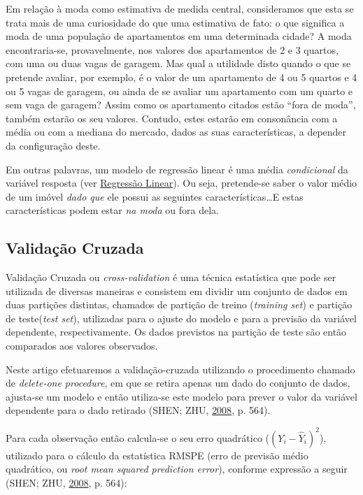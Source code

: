 \documentclass[a4paper, 12pt]{article}
\begin{document}
Em relação à moda como estimativa de medida central, consideramos que
esta se trata mais de uma curiosidade do que uma estimativa de fato: o
que significa a moda de uma população de apartamentos em uma determinada
cidade? A moda encontraria-se, provavelmente, nos valores dos
apartamentos de 2 e 3 quartos, com uma ou duas vagas de garagem. Mas
qual a utilidade disto quando o que se pretende avaliar, por exemplo, é
o valor de um apartamento de 4 ou 5 quartos e 4 ou 5 vagas de garagem,
ou ainda de se avaliar um apartamento com um quarto e sem vaga de
garagem? Assim como os apartamento citados estão ``fora de moda'',
também estarão os seu valores. Contudo, estes estarão em consonância com
a média ou com a mediana do mercado, dados as suas características, a
depender da configuração deste.

Em outras palavras, um modelo de regressão linear é uma média
\emph{condicional} da variável resposta (ver
\protect\hyperlink{regressao-linear}{Regressão Linear}). Ou seja,
pretende-se saber o valor médio de um imóvel \emph{dado que} ele possui
as seguintes características\ldots{}E estas características podem estar
\emph{na moda} ou fora dela.

\subsection{Validação Cruzada}\label{validacao-cruzada}

Validação Cruzada ou \emph{cross-validation} é uma técnica estatística
que pode ser utilizada de diversas maneiras e consistem em dividir um
conjunto de dados em duas partições distintas, chamados de partição de
treino (\emph{training set}) e partição de teste(\emph{test set}),
utilizadas para o ajuste do modelo e para a previsão da variável
dependente, respectivamente. Os dados previstos na partição de teste são
então comparados aos valores observados.

Neste artigo efetuaremos a validação-cruzada utilizando o procedimento
chamado de \emph{delete-one procedure}, em que se retira apenas um dado
do conjunto de dados, ajusta-se um modelo e então utiliza-se este modelo
para prever o valor da variável dependente para o dado retirado (SHEN;
ZHU, \protect\hyperlink{ref-shen}{2008}, p. 564).

Para cada observação então calcula-se o seu erro quadrático
(\((Y_i - \hat{Y}_i)^2\)), utilizado para o cálculo da estatística RMSPE
(erro de previsão médio quadrático, ou \emph{root mean squared
prediction error}), conforme expressão a seguir (SHEN; ZHU,
\protect\hyperlink{ref-shen}{2008}, p. 564):
\end{document}
